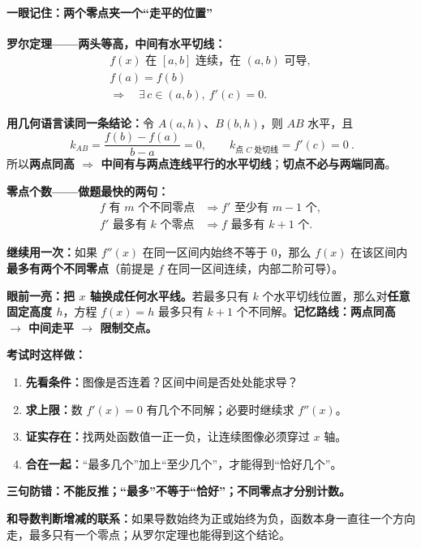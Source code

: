 \clearpage
\begin{summarybox}
\paragraph{一眼记住：两个零点夹一个“走平的位置”}

\textbf{罗尔定理——两头等高，中间有水平切线：}
\[
\boxed{\begin{gathered}
f(x)\text{ 在 }[a,b]\text{ 连续，在 }(a,b)\text{ 可导},\\
f(a)=f(b)\\[2pt]
\Longrightarrow\quad \exists\,c\in(a,b),\ f'(c)=0.
\end{gathered}}
\]


\textbf{用几何语言读同一条结论：}令 $A(a,h)$、$B(b,h)$，则 $AB$ 水平，且
\[
\boxed{\ k_{AB}=\frac{f(b)-f(a)}{b-a}=0,
\qquad k_{\text{点 }C\text{ 处切线}}=f'(c)=0\ }.
\]
所以\textbf{两点同高 $\Rightarrow$ 中间有与两点连线平行的水平切线}；\textbf{切点不必与两端同高}。

\textbf{零点个数——做题最快的两句：}
\[
\boxed{\begin{aligned}
f\text{ 有 }m\text{ 个不同零点}&\Longrightarrow f'\text{ 至少有 }m-1\text{ 个},\\
f'\text{ 最多有 }k\text{ 个零点}&\Longrightarrow f\text{ 最多有 }k+1\text{ 个}.
\end{aligned}}
\]

\textbf{继续用一次：}如果 $f''(x)$ 在同一区间内始终不等于 $0$，那么 $f(x)$ 在该区间内\textbf{最多有两个不同零点}（前提是 $f$ 在同一区间连续，内部二阶可导）。

\textbf{眼前一亮：把 $x$ 轴换成任何水平线。}若最多只有 $k$ 个水平切线位置，那么对\textbf{任意固定高度 $h$}，方程 $f(x)=h$ 最多只有 $k+1$ 个不同解。\textbf{记忆路线：两点同高 $\rightarrow$ 中间走平 $\rightarrow$ 限制交点。}


\textbf{考试时这样做：}
\begin{enumerate}
  \item \textbf{先看条件：}图像是否连着？区间中间是否处处能求导？
  \item \textbf{求上限：}数 $f'(x)=0$ 有几个不同解；必要时继续求 $f''(x)$。
  \item \textbf{证实存在：}找两处函数值一正一负，让连续图像必须穿过 $x$ 轴。
  \item \textbf{合在一起：}“最多几个”加上“至少几个”，才能得到“恰好几个”。
\end{enumerate}

\textbf{三句防错：}\textbf{不能反推；“最多”不等于“恰好”；不同零点才分别计数。}

\textbf{和导数判断增减的联系：}如果导数始终为正或始终为负，函数本身一直往一个方向走，最多只有一个零点；从罗尔定理也能得到这个结论。
\end{summarybox}


